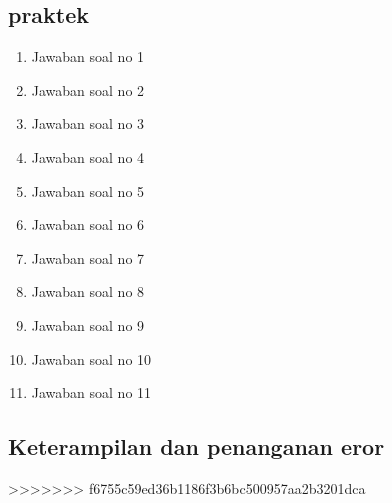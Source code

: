 \subsection{praktek}
\begin{enumerate}
    \item Jawaban soal no 1
    
    \item Jawaban soal no 2
    
    \item Jawaban soal no 3
    
    \item Jawaban soal no 4
    
    \item Jawaban soal no 5
    
    \item Jawaban soal no 6
    
    \item Jawaban soal no 7
    
    \item Jawaban soal no 8
    
    \item Jawaban soal no 9
    
    \item Jawaban soal no 10
    
    \item Jawaban soal no 11
    
\end{enumerate}

\subsection{Keterampilan dan penanganan eror}
    
>>>>>>> f6755c59ed36b1186f3b6bc500957aa2b3201dca

